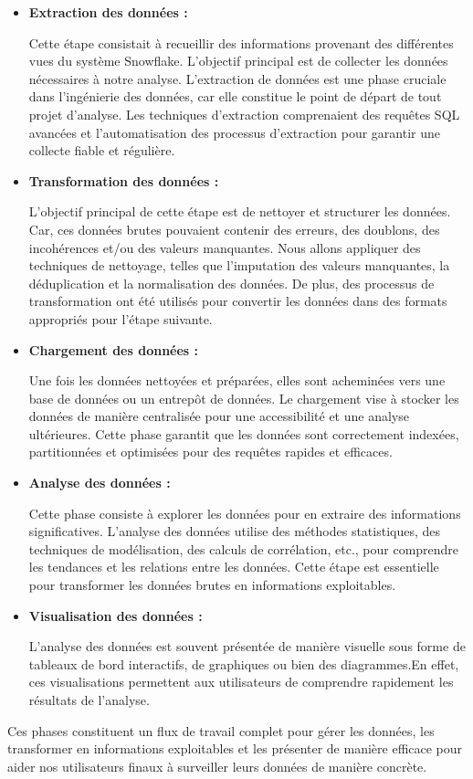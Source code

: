   \begin{itemize}
  
  \item \textbf{Extraction des données :}
  \par Cette étape consistait à recueillir des informations provenant des différentes vues du système Snowflake. 
  L'objectif principal est de collecter les données nécessaires à notre analyse. 
  L'extraction de données est une phase cruciale dans l'ingénierie des données, car elle constitue le point de départ de tout projet d'analyse. 
  Les techniques d'extraction comprenaient des requêtes SQL avancées et l'automatisation des processus d'extraction pour garantir une collecte fiable et régulière.

  \item \textbf{Transformation des données :}
  \par L'objectif principal de cette étape est de nettoyer et structurer les données. Car, ces données brutes pouvaient contenir des erreurs, des doublons, des incohérences et/ou des valeurs manquantes. 
  Nous allons appliquer des techniques de nettoyage, telles que l'imputation des valeurs manquantes, la déduplication et la normalisation des données.
   De plus, des processus de transformation ont été utilisés pour convertir les données dans des formats appropriés pour l'étape suivante.

  \item \textbf{Chargement des données :}
  \par Une fois les données nettoyées et préparées, elles sont acheminées vers une base de données ou un entrepôt de données. Le chargement vise à stocker les données de manière centralisée pour une accessibilité et une analyse ultérieures.
   Cette phase garantit que les données sont correctement indexées, partitionnées et optimisées pour des requêtes rapides et efficaces.

  \item \textbf{Analyse des données :}
  \par Cette phase consiste à explorer les données pour en extraire des informations significatives. 
  L'analyse des données utilise des méthodes statistiques, des techniques de modélisation, des calculs de corrélation, etc., pour comprendre les tendances et les relations entre les données.
   Cette étape est essentielle pour transformer les données brutes en informations exploitables.

  \item \textbf{Visualisation des données :}
  \par L'analyse des données est souvent présentée de manière visuelle sous forme de tableaux de bord interactifs, de graphiques ou bien des diagrammes.En effet, ces visualisations permettent aux utilisateurs de comprendre rapidement les résultats de l'analyse. 

  \end{itemize}
  \par Ces phases constituent un flux de travail complet pour gérer les données, les transformer en informations exploitables et les présenter de manière efficace pour aider nos utilisateurs finaux à surveiller leurs données de manière concrète.

